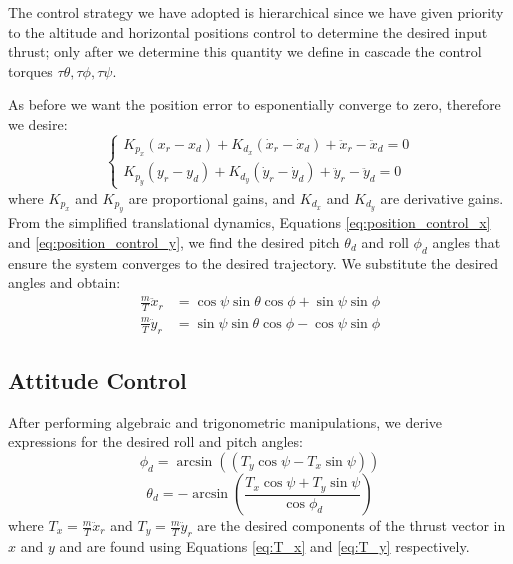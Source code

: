 The control strategy we have adopted is hierarchical \cite{model_quadrotor}
since we have given priority to the 
altitude and horizontal positions control to determine the desired input thrust;
only after we determine this quantity
we define in cascade the control torques $\tau\theta, \tau\phi, \tau\psi$.

As before we want the position error to esponentially converge to zero,
therefore we desire:
\begin{equation}
    \begin{cases}
        K_{p_x} ( x_r - x_d )  + K_{d_x} (\dot{x}_r -\dot{x}_d) + \ddot{x}_r -\ddot{x}_d  = 0 \\[6pt]
        K_{p_y} (y_r - y_d )  + K_{d_y} ( \dot{y}_r - \dot{y}_d) +  \ddot{y}_r - \ddot{y}_d = 0
    \end{cases}
\end{equation}
where $K_{p_x}$ and $K_{p_y}$ are proportional gains, and $K_{d_x}$ and $K_{d_y}$ are derivative gains.
\noindent \\
From the simplified translational dynamics, Equations \ref{eq:position_control_x}
and \ref{eq:position_control_y}, we find the desired pitch \( \theta_d \) 
and roll \( \phi_d \) angles that ensure the system converges to the desired trajectory.
We substitute the desired angles and obtain:
\begin{subequations}
    \begin{align}
    \frac{m}{T} \ddot{x}_r &= \cos\psi \sin\theta \cos\phi + \sin\psi \sin\phi \label{eq:T_x} \\[6pt]
    \frac{m}{T} \ddot{y}_r &= \sin\psi \sin\theta \cos\phi - \cos\psi \sin\phi \label{eq:T_y}
    \end{align}
\end{subequations}
\subsection{Attitude Control}
\noindent
After performing algebraic and trigonometric manipulations, we derive expressions for the desired roll and pitch angles:
\begin{equation}
    \phi_d =  \arcsin\left(  (T_y \cos\psi - T_x \sin\psi) \right)
    \label{eq:desire_phi}
\end{equation}
\begin{equation}
    \theta_d = - \arcsin\left(\frac{T_x \cos\psi + T_y \sin\psi}{ \cos\phi_d } \right)
    \label{eq:desire_theta}
\end{equation}
where $T_x = \frac{m}{T} \ddot{x}_r$ and $T_y = \frac{m}{T} \ddot{y}_r$ are the
desired components of the thrust vector in $x$ and $y$ and are found
using Equations \ref{eq:T_x} and \ref{eq:T_y} respectively.

